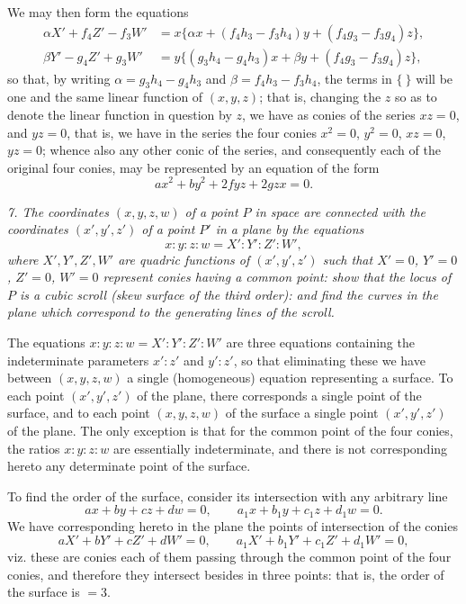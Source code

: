 \documentclass[11pt,a4paper]{article}
\theoremstyle{plain}
\theoremstyle{definition}
\begin{document}
We may then form the equations
\[
\begin{aligned}
\alpha X'+f_4Z'-f_3W'&=x\{\alpha x+(f_4h_3-f_3h_4)y+(f_4g_3-f_3g_4)z\},\\
\beta Y'-g_4Z'+g_3W'&=y\{(g_3h_4-g_4h_3)x+\beta y+(f_4g_3-f_3g_4)z\},
\end{aligned}
\]
so that, by writing $\alpha=g_3h_4-g_4h_3$ and $\beta=f_4h_3-f_3h_4$, the terms in $\{\ \}$ will be one and the same linear function of $(x,y,z)$; that is, changing the $z$ so as to denote the linear function in question by $z$, we have as conies of the series $xz=0$, and $yz=0$, that is, we have in the series the four conies $x^2=0$, $y^2=0$, $xz=0$, $yz=0$; whence also any other conic of the series, and consequently each of the original four conies, may be represented by an equation of the form
\[
ax^2+by^2+2fyz+2gzx=0.
\]

\noindent\textit{7. The coordinates $(x,y,z,w)$ of a point $P$ in space are connected with the coordinates $(x',y',z')$ of a point $P'$ in a plane by the equations}
\[
x:y:z:w=X':Y':Z':W',
\]
\textit{where $X',Y',Z',W'$ are quadric functions of $(x',y',z')$ such that $X'=0$, $Y'=0$, $Z'=0$, $W'=0$ represent conies having a common point: show that the locus of $P$ is a cubic scroll (skew surface of the third order): and find the curves in the plane which correspond to the generating lines of the scroll.}

\newpage

The equations $x:y:z:w=X':Y':Z':W'$ are three equations containing the indeterminate parameters $x':z'$ and $y':z'$, so that eliminating these we have between $(x,y,z,w)$ a single (homogeneous) equation representing a surface. To each point $(x',y',z')$ of the plane, there corresponds a single point of the surface, and to each point $(x,y,z,w)$ of the surface a single point $(x',y',z')$ of the plane. The only exception is that for the common point of the four conies, the ratios $x:y:z:w$ are essentially indeterminate, and there is not corresponding hereto any determinate point of the surface.

To find the order of the surface, consider its intersection with any arbitrary line
\[
ax+by+cz+dw=0,\qquad a_1x+b_1y+c_1z+d_1w=0.
\]
We have corresponding hereto in the plane the points of intersection of the conies
\[
aX'+bY'+cZ'+dW'=0,\qquad
a_1X'+b_1Y'+c_1Z'+d_1W'=0,
\]
viz. these are conies each of them passing through the common point of the four conies, and therefore they intersect besides in three points: that is, the order of the surface is $=3$.
\end{document}
